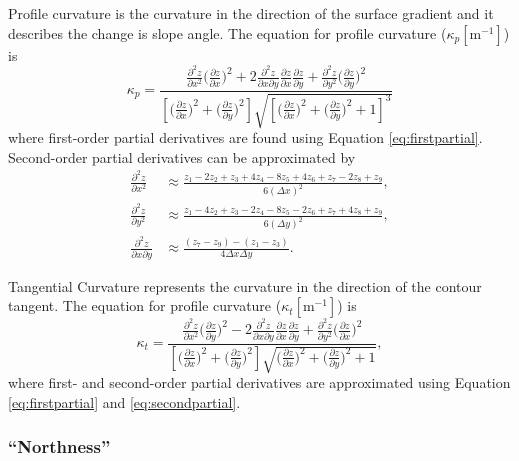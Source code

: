 \documentclass{sfuthesis}
\begin{document}
Profile curvature is the curvature in the direction of the surface gradient and it describes the change is slope angle. The equation for profile curvature ($\kappa_p \left[\mathrm{m}^{-1}\right]$) is \citep{Neteler2008}
\begin{equation} 
\kappa_p = \frac{\frac{\partial^2 z}{\partial x^2} \big(\frac{\partial z}{\partial x}\big)^2 + 2\frac{\partial^2 z}{\partial x \partial y}\frac{\partial z}{\partial x}\frac{\partial z}{\partial y} +  \frac{\partial^2 z}{\partial y^2} \big(\frac{\partial z}{\partial y}\big)^2}{\left[\big( \frac{\partial z}{\partial x} \big) ^2 + \big(\frac{\partial z}{\partial y} \big)^2\right] \sqrt{\left[\big(\frac{\partial z}{\partial x} \big) ^2 + \big( \frac{\partial z}{\partial y}\big) ^2+1\right]^3}}
\end{equation} 
where first-order partial derivatives are found using Equation \ref{eq:firstpartial}. Second-order partial derivatives can be approximated by \citep{Hofierka2009, Neteler2008}
\begin{align}\label{eq:secondpartial}
\frac{\partial^2 z}{\partial x^2} &\approx\frac{z_1-2z_2+z_3+4z_4-8z_5+4z_6+z_7-2z_8+z_9}{6  (\Delta x)^2},\nonumber\\
\frac{\partial^2 z}{\partial y^2} &\approx \frac{z_1-4z_2+z_3-2z_4-8z_5-2z_6+z_7+4z_8+z_9}{6  (\Delta y)^2},\nonumber\\
\frac{\partial^2 z}{\partial x \partial y} &\approx \frac{(z_7-z_9)-(z_1-z_3)}{4  \Delta x \Delta y}.
\end{align}

Tangential Curvature represents the curvature in the direction of the contour tangent. The equation for profile curvature ($\kappa_t \left[\mathrm{m}^{-1}\right]$) is \citep{Neteler2008}
\begin{equation}
\kappa_t = \frac{\frac{\partial^2 z}{\partial x^2} \big(\frac{\partial z}{\partial y}\big)^2 - 2\frac{\partial^2 z}{\partial x \partial y}\frac{\partial z}{\partial x}\frac{\partial z}{\partial y} +  \frac{\partial^2 z}{\partial y^2} \big(\frac{\partial z}{\partial x}\big)^2}{\left[\big( \frac{\partial z}{\partial x} \big) ^2 + \big(\frac{\partial z}{\partial y} \big)^2\right] \sqrt{\big(\frac{\partial z}{\partial x} \big) ^2 + \big( \frac{\partial z}{\partial y}\big) ^2 +1}},
\end{equation} 	
where first- and second-order partial derivatives are approximated using Equation \ref{eq:firstpartial} and \ref{eq:secondpartial}. 

\subsubsection*{``Northness''} 
\end{document}

